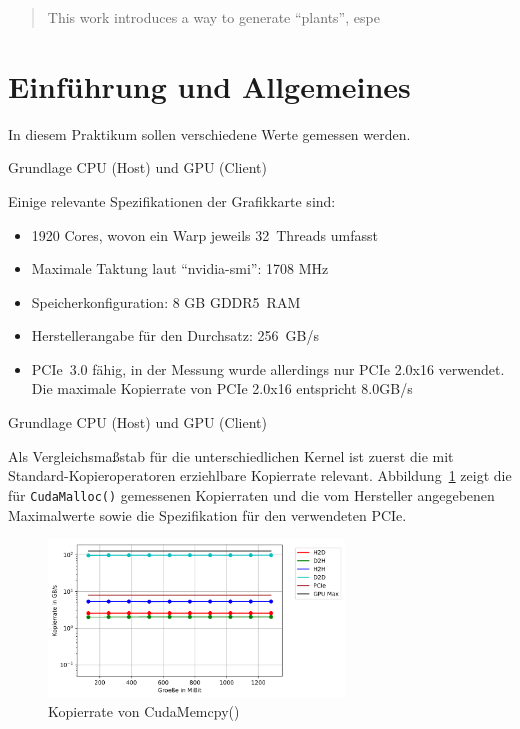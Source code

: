 \documentclass[11pt, abstract=on]{scrartcl}
\begin{document}
\lstset{language=[11]C++}   

\begin{abstract}

This work introduces a way to generate ``plants'', espe
\end{abstract}

\section{Einführung und Allgemeines}
In diesem Praktikum sollen verschiedene Werte gemessen werden. 

Grundlage CPU (Host) und GPU (Client)

Einige relevante Spezifikationen der Grafikkarte sind:
\begin{itemize}
	\item 1920 Cores, wovon ein Warp jeweils 32~Threads umfasst
	\item Maximale Taktung laut "`nvidia-smi"': 1708 MHz
	\item Speicherkonfiguration: 8 GB GDDR5~RAM
	\item Herstellerangabe für den Durchsatz: 256~GB/s
	\item PCIe~3.0 fähig, in der Messung wurde allerdings nur PCIe 2.0x16 verwendet. Die maximale Kopierrate von PCIe 2.0x16 entspricht 8.0GB/s
\end{itemize}

Grundlage CPU (Host) und GPU (Client) 

Als Vergleichsmaßstab für die unterschiedlichen Kernel ist zuerst die mit Standard-Kopieroperatoren erziehlbare Kopierrate relevant. Abbildung~\ref{fig:Kopierrate} zeigt die für \texttt{CudaMalloc()} gemessenen Kopierraten und die vom Hersteller angegebenen Maximalwerte sowie die Spezifikation für den verwendeten PCIe.

\begin{figure} [htbp]
 	\centering
 		\includegraphics[width=0.7\textwidth]{Graph_Kopierrate.png}
 	\caption{Kopierrate von CudaMemcpy()}
 	\label{fig:Kopierrate}
\end{figure}
\end{document}
